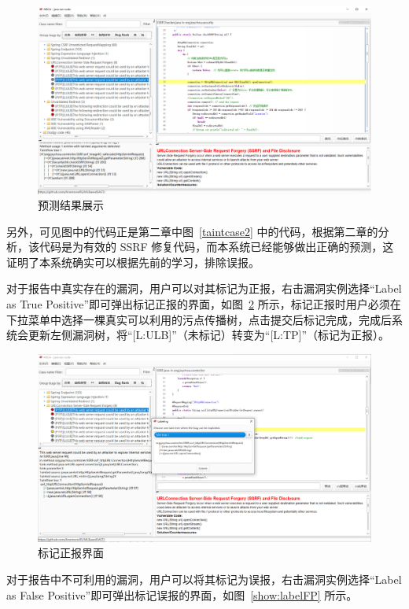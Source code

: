 \begin{figure}[H]
    \centering
    \includegraphics[width=0.8\linewidth]{FIGs/chapter4/predictResult.png}
    \caption{预测结果展示}\label{show:predictResult}
\end{figure}

另外，可见图中的代码正是第二章中图~\ref{taintcase2} 中的代码，根据第二章的分析，该代码是为有效的 SSRF 修复代码，而本系统已经能够做出正确的预测，这证明了本系统确实可以根据先前的学习，排除误报。

对于报告中真实存在的漏洞，用户可以对其标记为正报，右击漏洞实例选择“Label as True Positive”即可弹出标记正报的界面，如图~\ref{show:labelTP} 所示，标记正报时用户必须在下拉菜单中选择一棵真实可以利用的污点传播树，点击提交后标记完成，完成后系统会更新左侧漏洞树，将“[L:ULB]”（未标记）转变为“[L:TP]”（标记为正报）。

\begin{figure}[H]
    \centering
    \includegraphics[width=0.8\linewidth]{FIGs/chapter4/labelTP.png}
    \caption{标记正报界面}\label{show:labelTP}
\end{figure}

对于报告中不可利用的漏洞，用户可以将其标记为误报，右击漏洞实例选择“Label as False Positive”即可弹出标记误报的界面，如图~\ref{show:labelFP} 所示。

